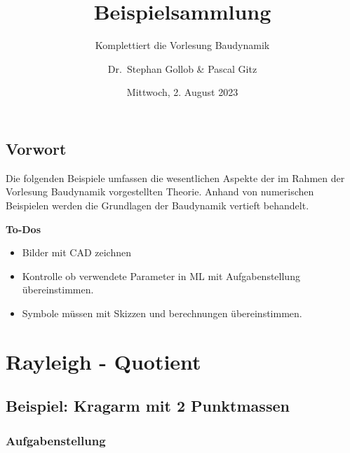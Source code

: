 \documentclass[
  letterpaper,
  DIV=11]{scrreprt}
\title{Beispielsammlung}
\subtitle{Komplettiert die Vorlesung Baudynamik}
\author{Dr.~Stephan Gollob \& Pascal Gitz}
\date{Mittwoch, 2. August 2023}
\providecommand{\tightlist}{%
  \setlength{\itemsep}{0pt}\setlength{\parskip}{0pt}}\usepackage{longtable,booktabs,array}
\renewcommand*\contentsname{Inhaltsverzeichnis}
\newcommand\contentsname{Inhaltsverzeichnis}
\begin{document}
\maketitle
\ifdefined\Shaded\renewenvironment{Shaded}{\begin{tcolorbox}[boxrule=0pt, interior hidden, breakable, borderline west={3pt}{0pt}{shadecolor}, frame hidden, enhanced, sharp corners]}{\end{tcolorbox}}\fi

\renewcommand*\contentsname{Inhaltsverzeichnis}
{
\hypersetup{linkcolor=}
\setcounter{tocdepth}{1}
\tableofcontents
}

\hypertarget{vorwort}{%
\chapter*{Vorwort}\label{vorwort}}


Die folgenden Beispiele umfassen die wesentlichen Aspekte der im Rahmen
der Vorlesung Baudynamik vorgestellten Theorie. Anhand von numerischen
Beispielen werden die Grundlagen der Baudynamik vertieft behandelt.

\textbf{To-Dos}

\begin{itemize}
\tightlist
\item
  Bilder mit CAD zeichnen
\item
  Kontrolle ob verwendete Parameter in ML mit Aufgabenstellung
  übereinstimmen.
\item
  Symbole müssen mit Skizzen und berechnungen übereinstimmen.
\end{itemize}

\part{Rayleigh - Quotient}

\hypertarget{beispiel-kragarm-mit-2-punktmassen}{%
\chapter{Beispiel: Kragarm mit 2
Punktmassen}\label{beispiel-kragarm-mit-2-punktmassen}}

\hypertarget{aufgabenstellung}{%
\section{Aufgabenstellung}\label{aufgabenstellung}}
\end{document}
